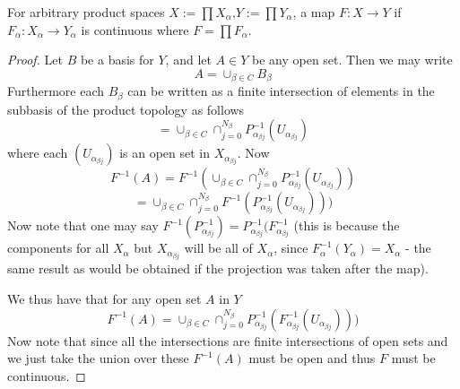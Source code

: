 \begin{lemma}
For arbitrary product spaces $X:=\prod X_\alpha$,$Y:=\prod Y_\alpha$,  a map $F:X \to Y$ if $F_\alpha: X_\alpha \to Y_\alpha$ is continuous where $F=\prod F_\alpha$. 
\begin{proof}
Let $B$ be a basis for $Y$, and let $A\in Y$ be any open set.
Then we may write
\[ A = \cup_{\beta \in C} B_\beta \]
Furthermore each $B_\beta$ can be written as a finite intersection of elements in the subbasis of the product topology as follows
\[ =  \cup_{\beta \in C} \cap_{j=0}^{N_\beta} P_{\alpha_{\beta j}}^{-1} (U_{\alpha_{\beta j}}) \]
where each $(U_{\alpha_{\beta j}})$ is an open set in $X_{\alpha_{\beta j}}$. Now 
\[ F^{-1} (A) = F^{-1}(\cup_{\beta \in C} \cap_{j=0}^{N_\beta} P_{\alpha_{\beta j}}^{-1} (U_{\alpha_{\beta j}})) \]
\[ = \cup_{\beta \in C} \cap_{j=0}^{N_\beta} F^{-1}(P_{\alpha_{\beta j}}^{-1} (U_{\alpha_{\beta j}}))) \]
Now note that one may say $F^{-1}(P^{-1}_{\alpha_{\beta j}}) = P^{-1}_{\alpha_{\beta j}}(F^{-1}_{\alpha_{\beta j}}$ (this is because the components for all $X_\alpha$ but $X_{\alpha_{\beta j}}$ will be all of $X_\alpha$, since $F_\alpha^{-1}(Y_\alpha) = X_\alpha$ - the same result as would be obtained if the projection was taken after the map). 

We thus have that for any open set $A$ in $Y$
\[ F^{-1}(A) = \cup_{\beta \in C} \cap_{j=0}^{N_\beta} P_{\alpha_{\beta j}}^{-1} (F_{\alpha_{\beta j}}^{-1}(U_{\alpha_{\beta j}}))) \]
Now note that since all the intersections are finite intersections of open sets and we just take the union over these $F^{-1}(A)$ must be open and thus $F$ must be continuous. 
\end{proof}
\end{lemma}

